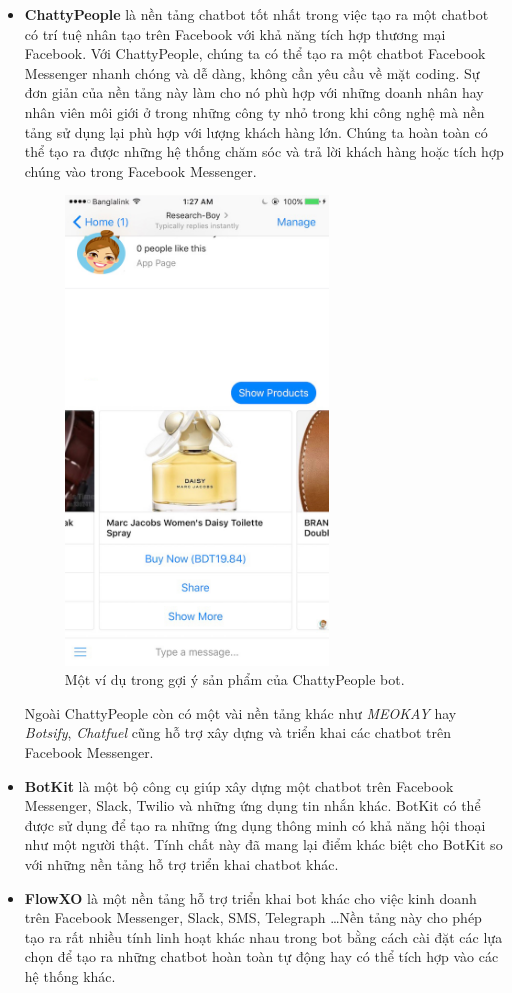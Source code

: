 \documentclass[12pt]{report}
\begin{document}
\begin{itemize}
	\item \textbf{ChattyPeople} là nền tảng chatbot tốt nhất trong việc tạo ra một chatbot có trí tuệ nhân tạo trên Facebook với khả năng tích hợp thương mại Facebook. Với ChattyPeople, chúng ta có thể tạo ra một chatbot Facebook Messenger nhanh chóng và dễ dàng, không cần yêu cầu về mặt coding. Sự đơn giản của nền tảng này làm cho nó phù hợp với những doanh nhân hay nhân viên môi giới ở trong những công ty nhỏ trong khi công nghệ mà nền tảng sử dụng lại phù hợp với lượng khách hàng lớn. Chúng ta hoàn toàn có thể tạo ra được những hệ thống chăm sóc và trả lời khách hàng hoặc tích hợp chúng vào trong Facebook Messenger.

	\begin{figure}[H]
	  \centering
	    \includegraphics[width=7cm]{Pics/Chap2/chatty-prople.jpg}
	  \caption{Một ví dụ trong gợi ý sản phẩm của ChattyPeople bot.}
	\end{figure}

Ngoài ChattyPeople còn có một vài nền tảng khác như \textit{MEOKAY} hay \textit{Botsify}, \textit{Chatfuel} cũng hỗ trợ xây dựng và triển khai các chatbot trên Facebook Messenger.

	\item \textbf{BotKit} là một bộ công cụ giúp xây dựng một chatbot trên Facebook Messenger, Slack, Twilio và những ứng dụng tin nhắn khác. BotKit có thể được sử dụng để tạo ra những ứng dụng thông minh có khả năng hội thoại như một người thật. Tính chất này đã mang lại điểm khác biệt cho BotKit so với những nền tảng hỗ trợ triển khai chatbot khác.

	\item \textbf{FlowXO} là một nền tảng hỗ trợ triển khai bot khác cho việc kinh doanh trên Facebook Messenger, Slack, SMS, Telegraph \ldots Nền tảng này cho phép tạo ra rất nhiều tính linh hoạt khác nhau trong bot bằng cách cài đặt các lựa chọn để tạo ra những chatbot hoàn toàn tự động hay có thể tích hợp vào các hệ thống khác.
\end{itemize}
\end{document}

